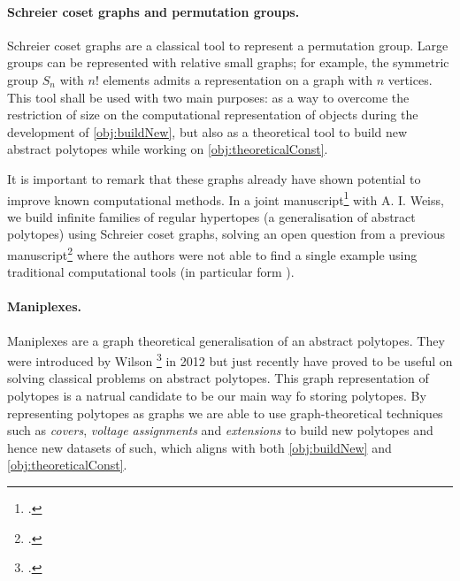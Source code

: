 \paragraph{Schreier coset graphs and permutation groups.}
Schreier coset graphs are a classical tool to represent a permutation group.
Large groups can be represented with relative small graphs; for example, the symmetric group $S_{n}$ with $n!$ elements admits a representation on a graph with $n$ vertices.
This tool shall be used with two main purposes: as a way to overcome the restriction of size on the computational representation of objects during the development of \cref{obj:buildNew}, but also as a theoretical tool to build new abstract polytopes while working on \cref{obj:theoreticalConst}.

It is important to remark that these graphs already have shown potential to improve known computational methods.
In a joint manuscript\footcite{MonteroWeiss_2021_ProperLocallySpherical} with A. I. Weiss, we build infinite families of regular hypertopes (a generalisation of abstract polytopes) using Schreier coset graphs, solving an open question from a previous manuscript\footcite{FernandesLeemansWeiss_2020_ExplorationLocallySpherical} where the authors were not able to find a single example using traditional computational tools (in particular \lins form \magma).

\paragraph{Maniplexes.} Maniplexes are a graph theoretical generalisation of an abstract polytopes.
They were introduced by Wilson \footcite{Wilson_2012_ManiplexesPart1} in 2012 but just recently have proved to be useful on solving classical problems on abstract polytopes.
This graph representation of polytopes is a natrual candidate to be our main way fo storing polytopes.
By representing polytopes as graphs we are able to use graph-theoretical techniques such as \emph{covers}, \emph{voltage assignments} and \emph{extensions} to build new polytopes and hence new datasets of such,
which aligns with both \cref{obj:buildNew} and \cref{obj:theoreticalConst}.

